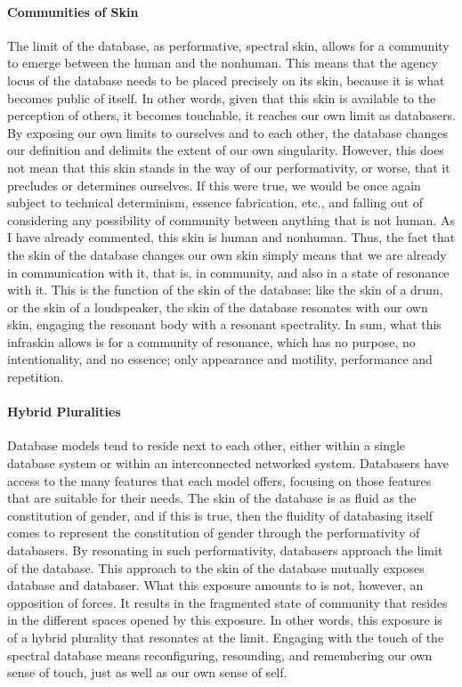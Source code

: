 \paragraph{Communities of Skin}
The limit of the database, as performative, spectral skin, allows for a community to emerge between the human and the nonhuman. This means that the agency locus of the database needs to be placed precisely on its skin, because it is what becomes public of itself. In other words, given that this skin is available to the perception of others, it becomes touchable, it reaches our own limit as databasers. By exposing our own limits to ourselves and to each other, the database changes our definition and delimits the extent of our own singularity. However, this does not mean that this skin stands in the way of our performativity, or worse, that it precludes or determines ourselves. If this were true, we would be once again subject to technical determinism, essence fabrication, etc., and falling out of considering any possibility of community between anything that is not human. As I have already commented, this skin is human and nonhuman. Thus, the fact that the skin of the database changes our own skin simply means that we are already in communication with it, that is, in community, and also in a state of resonance with it. This is the function of the skin of the database: like the skin of a drum, or the skin of a loudspeaker, the skin of the database resonates with our own skin, engaging the resonant body with a resonant spectrality. In sum, what this infraskin allows is for a community of resonance, which has no purpose, no intentionality, and no essence; only appearance and motility, performance and repetition.

\paragraph{Hybrid Pluralities}
Database models tend to reside next to each other, either within a single database system or within an interconnected networked system. Databasers have access to the many features that each model offers, focusing on those features that are suitable for their needs. The skin of the database is as fluid as the constitution of gender, and if this is true, then the fluidity of databasing itself comes to represent the constitution of gender through the performativity of databasers. By resonating in such performativity, databasers approach the limit of the database. This approach to the skin of the database mutually exposes database and databaser. What this exposure amounts to is not, however, an opposition of forces. It results in the fragmented state of community that resides in the different spaces opened by this exposure. In other words, this exposure is of a hybrid plurality that resonates at the limit. Engaging with the touch of the spectral database means reconfiguring, resounding, and remembering our own sense of touch, just as well as our own sense of self.

